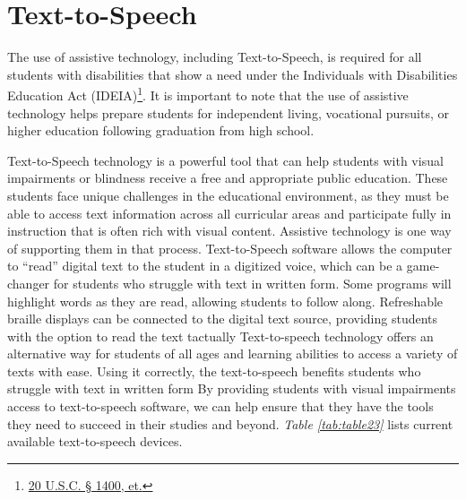 \pagebreak \hypertarget{text-to-speech}{}\section{Text-to-Speech}\label{text-to-speech}
The use of assistive technology, including Text-to-Speech, is required for all students with disabilities that show a need under the Individuals with Disabilities Education Act (IDEIA)\footnote{\raggedright \href{http://sites.ed.gov/idea/statuteregulations/}{20 U.S.C. § 1400, et.}}. It is important to note that the use of assistive technology helps prepare students for independent living, vocational pursuits, or higher education following graduation from high school. 

Text-to-Speech technology is a powerful tool that can help students with visual impairments or blindness receive a free and appropriate public education. These students face unique challenges in the educational environment, as they must be able to access text information across all curricular areas and participate fully in instruction that is often rich with visual content. Assistive technology is one way of supporting them in that process. Text-to-Speech software allows the computer to “read” digital text to the student in a digitized voice, which can be a game-changer for students who struggle with text in written form. Some programs will highlight words as they are read, allowing students to follow along. Refreshable braille displays can be connected to the digital text source, providing students with the option to read the text tactually Text-to-speech technology offers an alternative way for students of all ages and learning abilities to access a variety of texts with ease. Using it correctly, the text-to-speech benefits students who struggle with text in written form By providing students with visual impairments access to text-to-speech software, we can help ensure that they have the tools they need to succeed in their studies and beyond. \textit{Table \ref{tab:table23}} lists current available text-to-speech devices.

\pagebreak 
 
